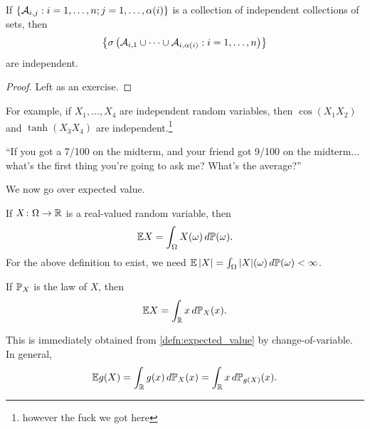 \begin{lemma} \label{lem:grouping_lemma}
    If $\{\mathcal A_{i,j} : i = 1, \dots, n; j = 1, \dots, \alpha(i)\}$ is a collection of independent collections of sets, then
    \[ \left\{ \sigma\left(\mathcal A_{i,1} \cup \dots \cup \mathcal A_{i,\alpha(i)} : i = 1, \dots, n \right)\right\} \]
    are independent.
\end{lemma}
\begin{proof}
    Left as an exercise.
\end{proof}

For example, if $X_1, \dots, X_4$ are independent random variables, then $\cos(X_1 X_2)$ and $\tanh(X_3 X_4)$ are independent.\footnote{however the fuck we got here}

{\color{airforceblue}``If you got a 7/100 on the midterm, and your friend got 9/100 on the midterm... what's the first thing you're going to ask me? What's the average?''}

We now go over expected value.
\begin{definition} \label{defn:expected_value}
    If $X \colon \Omega \to \mathbb R$ is a real-valued random variable, then
    \[ \mathbb E X = \int_{\Omega} X(\omega) \, d\mathbb P(\omega). \]
    For the above definition to exist, we need $\mathbb E \left\lvert X \right\rvert = \int_\Omega \left\lvert X \right\rvert\!(\omega) \, d\mathbb P(\omega) < \infty$.
\end{definition}

\begin{fact} \label{fact:expected_value}
    If $\mathbb P_X$ is the law of $X$, then
    \[ \mathbb E X = \int_\mathbb R x \, d \mathbb P_X(x). \]
\end{fact}

This is immediately obtained from \ref{defn:expected_value} by change-of-variable. In general,
\[ \mathbb E g(X) = \int_\mathbb R g(x) \, d\mathbb P_X(x) = \int_\mathbb R x \, d\mathbb P_{g(X)}(x). \]